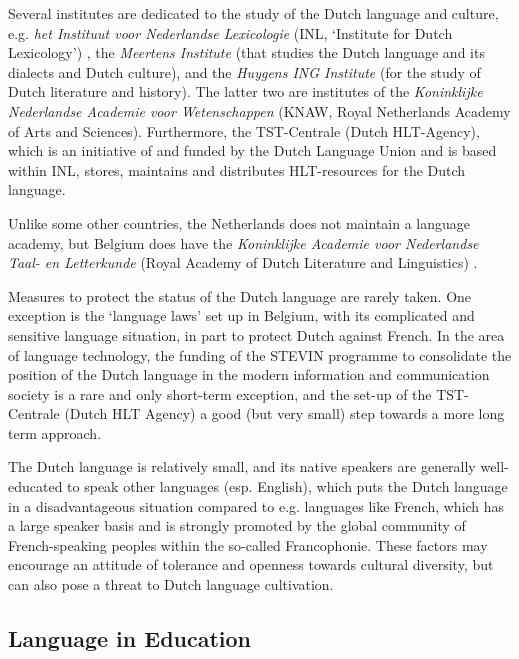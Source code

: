 \begin{multicols}{2}
    Several institutes are dedicated to the study of the Dutch language and culture, e.g. \textit{het Instituut voor Nederlandse Lexicologie} (INL, `Institute for Dutch Lexicology') \cite{INL}, the \textit{Meertens Institute} \cite{MI} (that studies the Dutch language and its dialects and Dutch culture), and the \textit{Huygens ING Institute} \cite{HING} (for the study of Dutch literature and history). The latter two are institutes of the \textit{Koninklijke Nederlandse Academie voor Wetenschappen} \cite{KNAW} (KNAW, Royal Netherlands Academy of Arts and Sciences).  Furthermore, the TST-Centrale \cite{TST-Centrale} (Dutch HLT-Agency), which is an initiative of and funded by the Dutch Language Union and is based within  INL, stores, maintains and distributes HLT-resources for the Dutch language.


    Unlike some other countries, the Netherlands does not maintain a language academy, but Belgium does have the \textit{Koninklijke Academie voor Nederlandse Taal- en Letterkunde} (Royal Academy of Dutch Literature and Linguistics) \cite{Kantl}.

    Measures to protect the status of the Dutch language are rarely taken. One exception is the `language laws' set up in Belgium, with its complicated and sensitive language situation, in part to protect Dutch against French. In the area of language technology, the funding of the STEVIN programme to consolidate the position of the Dutch language in the modern information and communication society is a rare and only short-term exception, and the set-up of the TST-Centrale (Dutch HLT Agency) a good (but very small) step towards a more long term approach.

    The Dutch language is relatively small, and its native speakers are generally well-educated to speak other languages (esp. English), which puts the Dutch language in a disadvantageous situation compared to e.g. languages like French, which has a large speaker basis and  is strongly promoted by the global community of French-speaking peoples within the so-called Francophonie. These factors may encourage an attitude of tolerance and openness towards cultural diversity, but can also pose a threat to Dutch language cultivation.

\subsection{Language in Education}


\end{multicols}
